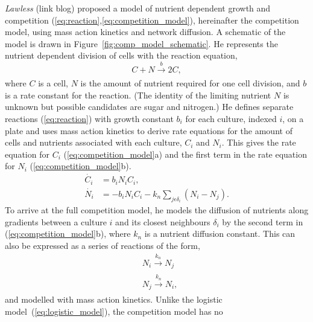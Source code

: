 \textit{Lawless} (link blog) proposed a model of nutrient dependent
growth and competition (\ref{eq:reaction},\ref{eq:competition_model}),
hereinafter the competition model, using mass action kinetics and
network diffusion. A schematic of the model is drawn in
Figure~\ref{fig:comp_model_schematic}. He represents the nutrient
dependent division of cells with the reaction equation,
\begin{equation}
  \label{eq:reaction}
    C + N \xrightarrow[]{b} 2C,
\end{equation}
where \(C\) is a cell, \(N\) is the amount of nutrient required for
one cell division, and \(b\) is a rate constant for the reaction. (The
identity of the limiting nutrient \(N\) is unknown but possible
candidates are sugar and nitrogen.) He defines separate reactions
(\ref{eq:reaction}) with growth constant \(b_{i}\) for each culture,
indexed \(i\), on a plate and uses mass action kinetics to derive rate
equations for the amount of cells and nutrients associated with each
culture, \(C_{i}\) and \(N_{i}\). This gives the rate equation for
\(C_{i}\) (\ref{eq:competition_model}a) and the first term in the rate
equation for \(N_{i}\) (\ref{eq:competition_model}b).
\begin{subequations}
  \label{eq:competition_model}
  \begin{align}
    \dot{C_{i}}& = b_{i}N_{i}C_{i},\\
    \dot{N_{i}}& = - b_{i}N_{i}C_{i} - k_{n}\sum_{j \epsilon \delta_i}(N_{i} - N_{j}).
  \end{align}
\end{subequations}
To arrive at the full competition model, he models the diffusion of
nutrients along gradients between a culture \(i\) and its closest
neighbours \(\delta_{i}\) by the second term in
(\ref{eq:competition_model}b), where \(k_{n}\) is a nutrient diffusion
constant. This can also be expressed as a series of reactions of the
form,
\begin{subequations}
  \label{eq:diffusion_reaction}
  \begin{align}
  &N_{i} \xrightarrow[]{k_{n}} N_{j}\\
  &N_{j} \xrightarrow[]{k_{n}} N_{i},
  \end{align}
\end{subequations}
and modelled with mass action kinetics. Unlike the logistic
model~(\ref{eq:logistic_model}), the competition model has no

